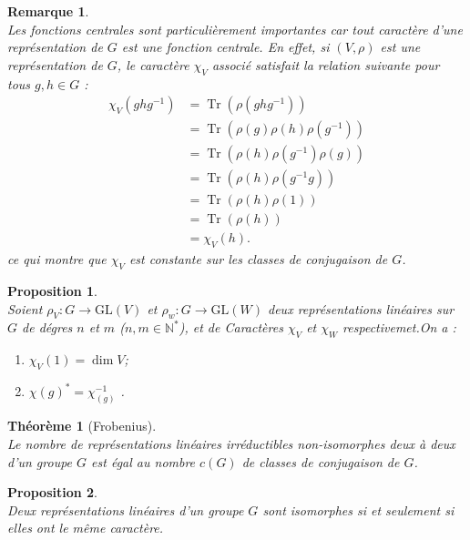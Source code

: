 \documentclass[a4paper, 14pt]{report}
\newtheorem{remark}{Remarque}[section]
\newtheorem{proposition}{Proposition}[section]
\newtheorem{theorem}{Théorème}[section]
\begin{document}
\begin{onehalfspace}
{			\begin{remark} \cite{renard2009groupes}\\
Les fonctions centrales sont particulièrement importantes car tout caractère d'une représentation de $G$ est une fonction centrale. En effet, si $(V, \rho)$ est une représentation de $G$, le caractère $\chi_V$ associé satisfait la relation suivante pour tous $g, h \in G$ :
				\begin{align*}
					\chi_V(ghg^{-1}) &= \operatorname{Tr}(\rho(ghg^{-1})) \\
					&= \operatorname{Tr}(\rho(g) \rho(h)\rho(g^{-1})) \\ 
					&= \operatorname{Tr}(\rho(h)\rho(g^{-1}) \rho(g) ) \\ 
					&= \operatorname{Tr}(\rho(h)\rho(g^{-1}g)) \\
					&= \operatorname{Tr}(\rho(h)\rho(1)) \\
					&= \operatorname{Tr}(\rho(h)) \\
					&= \chi_V(h).
				\end{align*}
				ce qui montre que $\chi_V$ est constante sur les classes de conjugaison de $G$.
			\end{remark}
			
			
			\begin{proposition} \cite{serre1971representation} \\
Soient \( \rho_V : G \rightarrow \mathrm{GL}(V) \) et \( \rho_w : G \rightarrow \mathrm{GL}(W) \) deux représentations linéaires sur \(G\) de dégres \(n\) et \(m\) (\(n,m \in \mathbb{N^*}\)), et de Caractères \( \chi_V \) et \(\chi_W \)  respectivemet.On a :
				\begin{enumerate}[label=\roman*)]
					\item \( \chi_V(1) = \dim V \);
					\item \( \chi{(g)^*} = {\chi_{(g)}^{-1}} \) \quad {}. 
				\end{enumerate}
			\end{proposition}
			
			\begin{theorem}[Frobenius] \cite{serre1971representation} \\
Le nombre de représentations linéaires irréductibles non-isomorphes deux à deux d'un groupe \( G \) est égal au nombre \( c(G) \) de classes de conjugaison de \( G \).
			\end{theorem}
			
			
			\begin{proposition} \cite{renard2009groupes}\\
Deux représentations linéaires d’un groupe \( G \) sont isomorphes si et seulement si elles ont le même caractère.
			\end{proposition}
			
}
\end{onehalfspace}
\end{document}
